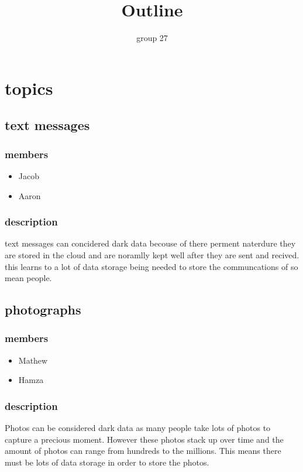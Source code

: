 \documentclass{article}
\begin{document}
\title{Outline}
\author{group 27}

\maketitle
\newpage


\section{topics}
\subsection{text messages} 
\subsubsection{members}
\begin{itemize}
    \item Jacob
    \item Aaron
\end{itemize}
\subsubsection{description}
 text messages can concidered dark data becouse of there perment naterdure they are stored in the cloud and 
 are noramlly kept well after they are sent and recived. this learns to a lot of data storage being needed to
 store the communcations of so mean people.

\subsection{photographs}
\subsubsection{members}
\begin{itemize}
    \item Mathew
    \item Hamza
\end{itemize}
\subsubsection{description}
Photos can be considered dark data as many people take lots of photos to capture a precious moment. However these photos stack up over time and the amount of photos can range from hundreds to the millions. This means there must be lots of data storage in order to store the photos.
\end{document}
